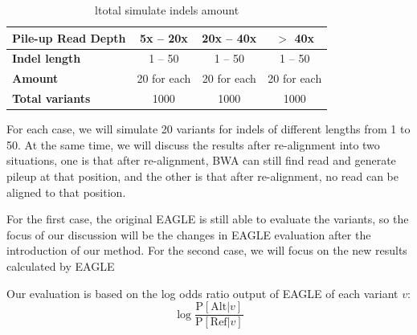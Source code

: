\vspace{0.5cm}
\begin{table}[ht]
\center
\caption[total simulate indels amount]{ltotal simulate indels amount}
\vspace{-0.5cm}
\begin{tabular}{|l|c|c|c|}
\hline
\rowcolor{lightgray}
\textbf{Pile-up Read Depth}&    \textbf{5x -- 20x} &    \textbf{20x -- 40x} &    \textbf{$>$ 40x}\\
\hline
\cellcolor{lightgray}\textbf{Indel length} &   1 -- 50&     1 -- 50&     1 -- 50\\
\hline
\cellcolor{lightgray}\textbf{Amount} &   20 for each&    20 for each&     20 for each\\
\hline
\cellcolor{lightgray}\textbf{Total variants} &   1000&     1000&     1000\\
\hline
\end{tabular}
\label{tab:simulate-amount}
\end{table}


For each case, we will simulate 20 variants for indels of different lengths from 1 to 50. At the same time, we will discuss the results after re-alignment into two situations, one is that after re-alignment, BWA can still find read and generate pileup at that position, and the other is that after re-alignment, no read can be aligned to that position.

For the first case, the original EAGLE is still able to evaluate the variants, so the focus of our discussion will be the changes in EAGLE evaluation after the introduction of our method. For the second case, we will focus on the new results calculated by EAGLE

\begin{samepage}
\noindent
Our evaluation is based on the log odds ratio output of EAGLE of each variant $v$:
\begin{equation*}
\log \frac{\text{P}[\text{Alt} | v]}{\text{P}[\text{Ref} | v]}
\end{equation*}
\end{samepage}


